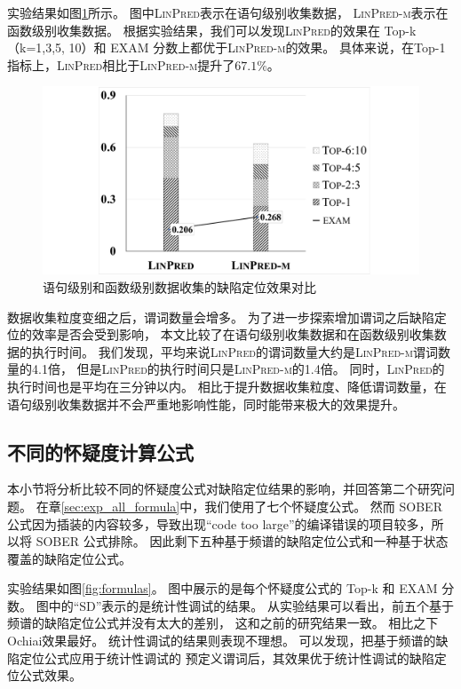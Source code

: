 实验结果如图\ref{fig:ms-level-compare}所示。
图中\textsc{LinPred}表示在语句级别收集数据，
\textsc{LinPred-m}表示在函数级别收集数据。
根据实验结果，我们可以发现\textsc{LinPred}的效果在
Top-k（k=1,3,5, 10）和 EXAM 分数上都优于\textsc{LinPred-m}的效果。
具体来说，在Top-1指标上，\textsc{LinPred}相比于\textsc{LinPred-m}提升了$67.1\%$。


\begin{figure}[htbp] 
\centering 
\includegraphics[width=12cm]{figure/ms-level-compare} 
\caption{语句级别和函数级别数据收集的缺陷定位效果对比} 
\label{fig:ms-level-compare}
\end{figure}

数据收集粒度变细之后，谓词数量会增多。
为了进一步探索增加谓词之后缺陷定位的效率是否会受到影响，
本文比较了在语句级别收集数据和在函数级别收集数据的执行时间。
我们发现，平均来说\textsc{LinPred}的谓词数量大约是\textsc{LinPred-m}谓词数量的4.1倍，
但是\textsc{LinPred}的执行时间只是\textsc{LinPred-m}的1.4倍。
同时，\textsc{LinPred}的执行时间也是平均在三分钟以内。
相比于提升数据收集粒度、降低谓词数量，在语句级别收集数据并不会严重地影响性能，同时能带来极大的效果提升。

\subsection{不同的怀疑度计算公式}

本小节将分析比较不同的怀疑度公式对缺陷定位结果的影响，并回答第二个研究问题。
在章\ref{sec:exp_all_formula}中，我们使用了七个怀疑度公式。
然而 SOBER 公式因为插装的内容较多，导致出现“code too large”的编译错误的项目较多，所以将 SOBER 公式排除。
因此剩下五种基于频谱的缺陷定位公式和一种基于状态覆盖的缺陷定位公式。

实验结果如图\ref{fig:formulas}。
图中展示的是每个怀疑度公式的 Top-k 和 EXAM 分数。
图中的“SD”表示的是统计性调试的结果。
从实验结果可以看出，前五个基于频谱的缺陷定位公式并没有太大的差别，
这和之前的研究结果一致。
相比之下Ochiai效果最好。
统计性调试的结果则表现不理想。
可以发现，把基于频谱的缺陷定位公式应用于统计性调试的
预定义谓词后，其效果优于统计性调试的缺陷定位公式效果。

